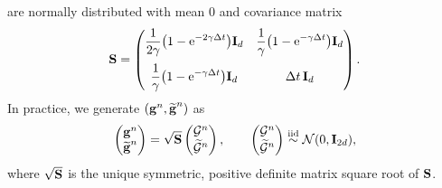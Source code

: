 \documentclass[11pt,a4paper]{article}
\begin{document}
are normally distributed with mean 0 and covariance matrix
\[
    \boldsymbol{\mathbf S} =
    \begin{pmatrix}
        \displaystyle \frac{1}{2 \gamma} \bigl(1 - \mathrm{e}^{-2 \gamma \Delta t}\bigr) \boldsymbol{\mathbf I}_d
        & \displaystyle \frac{1}{\gamma}\bigl(1 - \mathrm{e}^{-\gamma \Delta t}\bigr) \boldsymbol{\mathbf I}_d \\[.4cm]
        \displaystyle  \frac{1}{\gamma}\bigl(1 - \mathrm{e}^{-\gamma \Delta t}\bigr) \boldsymbol{\mathbf I}_d
        & \displaystyle \Delta t \, \boldsymbol{\mathbf I}_d
    \end{pmatrix}.
\]
In practice, we generate $(\boldsymbol{\mathbf g}^n, \widetilde {\boldsymbol{\mathbf g}}^n)$ as
\[
    \begin{pmatrix}
        \boldsymbol{\mathbf g}^n \\
        \widetilde {\boldsymbol{\mathbf g}}^n
    \end{pmatrix}
    =
    \sqrt{\boldsymbol{\mathbf S}}
    \begin{pmatrix}
        \mathcal  G^n \\
        \widetilde {\mathcal  G}^n
    \end{pmatrix},
    \qquad
    \begin{pmatrix}
        \mathcal  G^n \\
        \widetilde {\mathcal  G}^n
    \end{pmatrix}
    \overset{\rm iid} \sim
    \mathcal N(0, \boldsymbol{\mathbf I}_{2d}),
\]
where $\sqrt{\boldsymbol{\mathbf S}}$ is the unique symmetric, positive definite matrix square root of $\boldsymbol{\mathbf S}$.

\end{document}

